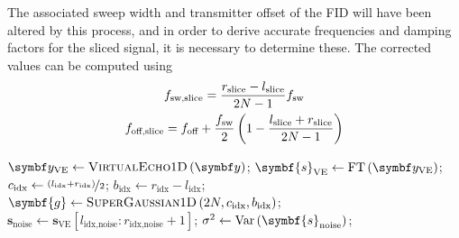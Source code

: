 The associated sweep width and transmitter offset of the \ac{FID} will have
been altered by this process, and in order to derive accurate frequencies and
damping factors for the sliced signal, it is necessary to determine these. The
corrected values can be computed using
\begin{subequations}
    \begin{gather}
        f_{\text{sw,slice}} = \frac{r_{\text{slice}} - l_{\text{slice}}}{2N - 1} f_{\mathrm{sw}}\\
        f_{\text{off,slice}} = f_{\text{off}} + \frac{f_{\mathrm{sw}}}{2} \left(
            1 - \frac{l_{\text{slice}} + r_{\text{slice}}}{2N - 1}
        \right)
    \end{gather}
\end{subequations}

\begin{algorithm}
    \begin{algorithmic}
        \caption[
            Filtering procedure for 1D data.
        ]
        {
            Filtering procedure for 1D data.
            $l_{\text{idx}}$ and $r_{\text{idx}}$ are indices of the left and
            right bounds of the region of interest.
            $l_{\text{idx,noise}}$ and $r_{\text{idx,noise}}$ are the analogous
            bounds for the noise region. All of these values should be $\in
            \lbrace 0, \cdots, 2N - 1 \rbrace$.
            These would typically be provided in units of \unit{\hertz} or
            \unit{\partspermillion} by a user; conversion to indices can
            be carried out using \cref{eq:fidx}.
        }
        \label{alg:filter-1d}
            \State $\by_{\text{VE}} \gets \textsc{VirtualEcho$1$D}\left(\by\right)$;
            \State $\symbf{s}_{\text{VE}} \gets \FT\left(\by_{\text{VE}}\right)$;
            \State $c_{\text{idx}} \gets \nicefrac{\left(l_{\text{idx}} + r_{\text{idx}}\right)}{2}$;
            \State $b_{\text{idx}} \gets r_{\text{idx}} - l_{\text{idx}}$;
            \State $\symbf{g} \gets \textsc{SuperGaussian$1$D}\left(2N, c_{\text{idx}}, b_{\text{idx}}\right)$;
            \State $\symbf{s}_{\text{noise}} \gets \symbf{s}_{\text{VE}} \left[
                l_{\text{idx,noise}} : r_{\text{idx,noise}} + 1
            \right]
            $;
            \State $\sigma^2 \gets \Var\left(\symbf{s}_{\text{noise}}\right)$;

\end{algorithmic}
\end{algorithm}
